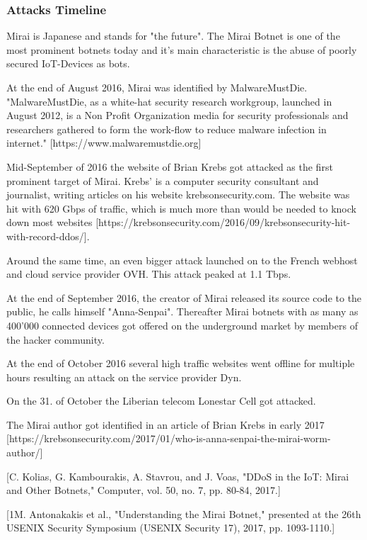 	\subsubsection{Attacks Timeline}
	Mirai is Japanese and stands for "the future". The Mirai Botnet is one of the most prominent botnets today and it's main characteristic is the abuse of poorly secured IoT-Devices as bots.
	
	At the end of August 2016, Mirai was identified by MalwareMustDie. "MalwareMustDie, as a white-hat security research workgroup, launched in August 2012, is a Non Profit Organization media for security professionals and researchers gathered to form the work-flow to reduce malware infection in internet." [https://www.malwaremustdie.org] 
	
	Mid-September of 2016 the website of Brian Krebs got attacked as the first prominent target of Mirai. Krebs' is a computer security consultant and journalist, writing articles on his website krebsonsecurity.com. The website was hit with 620 Gbps of traffic, which is much more than would be needed to knock down most websites [https://krebsonsecurity.com/2016/09/krebsonsecurity-hit-with-record-ddos/].
	
	Around the same time, an even bigger attack launched on to the French webhost and cloud service provider OVH. This attack peaked at 1.1 Tbps.
	
	At the end of September 2016, the creator of Mirai released its source code to the public, he calls himself "Anna-Senpai". Thereafter Mirai botnets with as many as 400'000 connected devices got offered on the underground market by members of the hacker community.
	
	At the end of October 2016 several high traffic websites went offline for multiple hours resulting an attack on the service provider Dyn.
	
	On the 31. of October the Liberian telecom Lonestar Cell got attacked.
	
	The Mirai author got identified in an article of Brian Krebs in early 2017 [https://krebsonsecurity.com/2017/01/who-is-anna-senpai-the-mirai-worm-author/]
	
	[C. Kolias, G. Kambourakis, A. Stavrou, and J. Voas, "DDoS in the IoT: Mirai and Other Botnets," Computer, vol. 50, no. 7, pp. 80-84, 2017.]
	
	[1M. Antonakakis et al., "Understanding the Mirai Botnet," presented at the 26th {USENIX} Security Symposium ({USENIX} Security 17), 2017, pp. 1093-1110.]


